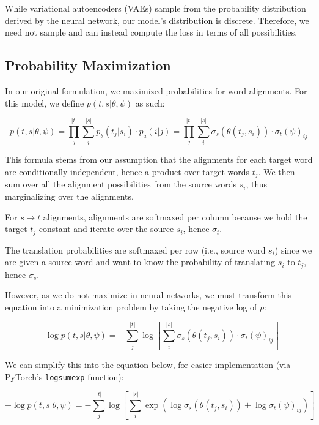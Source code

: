 \documentclass[twoside,twocolumn]{article}
\newlength\mystoreparindent
\newenvironment{myparindent}[1]{%
  \setlength{\mystoreparindent}{\the\parindent}
  \setlength{\parindent}{#1}
  }{%
  \setlength{\parindent}{\mystoreparindent}
}
\begin{document}
\begin{myparindent}{0pt}
While variational autoencoders (VAEs) sample from the probability distribution
derived by the neural network, our model's distribution is discrete.
Therefore, we need not sample and can instead compute the loss in terms of all
possibilities.

\subsection{Probability Maximization}

In our original formulation, we maximized probabilities for word alignments.
For this model, we define $p(t, s | \theta, \psi)$ as such:

\begin{equation}
  p(t, s | \theta, \psi)
    = \prod_j^{|t|} \sum_i^{|s|} p_\theta(t_j| s_i) \cdot p_a(i|j)
    = \prod_j^{|t|} \sum_i^{|s|} \sigma_s(\theta(t_j, s_i)) \cdot \sigma_t(\psi)_{ij}
\end{equation}

This formula stems from our assumption that the alignments for each target word
are conditionally independent, hence a product over target words $t_j$. We then
sum over all the alignment possibilities from the source words $s_i$, thus
marginalizing over the alignments.

For $s \mapsto t$ alignments, alignments are softmaxed per column because we
hold the target $t_j$ constant and iterate over the source $s_i$, hence
$\sigma_t$.

The translation probabilities are softmaxed per row (i.e., source word $s_i$)
since we are given a source word and want to know the probability of
translating $s_i$ to $t_j$, hence $\sigma_s$.

However, as we do not maximize in neural networks, we must transform this
equation into a minimization problem by taking the negative log of $p$:

\begin{equation}
  -\log p(t, s | \theta, \psi) =
  - \sum_j^{|t|}
     \log \left[ \sum_i^{|s|} \sigma_s \left( \theta(t_j, s_i) \right) \cdot
      \sigma_t(\psi)_{ij} \right]
\end{equation}

We can simplify this into the equation below, for easier implementation
(via PyTorch's \texttt{logsumexp} function):

\begin{equation}
  -\log  p(t , s | \theta, \psi) =
  - \sum_j^{|t|}  \log \left[ \sum_i^{|s|} \exp
      \left( \log \sigma_s(\theta(t_j, s_i)) + \log \sigma_t(\psi)_{ij} \right)
    \right]
\end{equation}


\end{myparindent}
\end{document}
